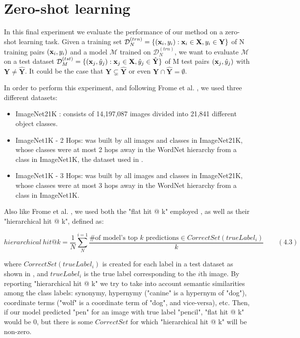 \documentclass[a4paper]{standalone}
\begin{document}
\section{Zero-shot learning}\label{sec:ZeroShotLearning}

In this final experiment we evaluate the performance of our method on a zero-shot learning task. Given a training set $\mathcal{D}^{(trn)}_N=\{(\mathbf{x}_i, y_i): \mathbf{x}_i \in \mathbf{X}, y_i \in \mathbf{Y}\}$ of N training pairs $(\mathbf{x}_i, y_i)$ and a model $\mathcal{M}$ trained on $\mathcal{D}^{(trn)}_N$, we want to evaluate $\mathcal{M}$ on a test dataset $\mathcal{D}^{(tst)}_M=\{(\mathbf{x}_j, \hat{y}_j): \mathbf{x}_j \in \mathbf{X}, \hat{y}_j \in \hat{\mathbf{Y}}\}$ of M test pairs $(\mathbf{x}_j, \hat{y}_j)$ with $\mathbf{Y} \neq \hat{\mathbf{Y}}$. It could be the case that $\mathbf{Y} \subsetneq \hat{\mathbf{Y}}$ or even $\mathbf{Y} \cap \hat{\mathbf{Y}} = \emptyset$.

In order to perform this experiment, and following Frome et al. \cite{frome2013devise}, we used three different datasets:
\begin{itemize}
    \item ImageNet21K \cite{ILSVRC15}: consists of 14,197,087 images divided into 21,841 different object classes.
    \item ImageNet1K - 2 Hops: was built by all images and classes in ImageNet21K, whose classes were at most 2 hops away in the WordNet \cite{miller1998wordnet} hierarchy from a class in ImageNet1K, the dataset used in .
    \item ImageNet1K - 3 Hops: was built by all images and classes in ImageNet21K, whose classes were at most 3 hops away in the WordNet  hierarchy from a class in ImageNet1K.
\end{itemize}

Also like Frome et al. \cite{frome2013devise}, we used both the "flat hit @ k" employed , as well as their "hierarchical hit @ k", defined as:

\begin{small}
    $$
        hierarchical\ hit @ k = \frac{1}{N}\sum_{N}^{i=1}\frac{\text{\# of model's top } k \text{ predictions} \in CorrectSet(trueLabel_i)}{k}\label{eq:h_at_k}\qquad (4.3)
    $$
\end{small}

where $CorrectSet(trueLabel_i)$ is created for each label in a test dataset as shown in , and $trueLabel_i$ is the true label corresponding to the $i$th image.
By reporting "hierarchical hit @ k" we try to take into account semantic similarities among the class labels: synonymy, hypernymy ("canine" is a hypernym of "dog"), coordinate terms ("wolf" is a coordinate term of "dog", and vice-versa), etc. Then, if our model predicted "pen" for an image with true label "pencil", "flat hit @ k" would be 0, but there is some $CorrectSet$ for which "hierarchical hit @ k" will be non-zero.
\end{document}
